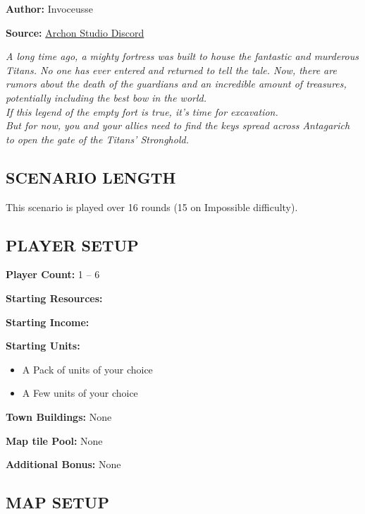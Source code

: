 
\begin{multicols*}{2}

\textbf{Author:} Invoceusse

\textbf{Source:} \href{https://discord.com/channels/740870068178649108/1219333721019256943}{Archon Studio Discord}

\textit{A long time ago, a mighty fortress was built to house the fantastic and murderous Titans.
  No one has ever entered and returned to tell the tale.
  Now, there are rumors about the death of the guardians and an incredible amount of treasures, potentially including the best bow in the world.\\
  If this legend of the empty fort is true, it's time for excavation.\\
  But for now, you and your allies need to find the keys spread across Antagarich to open the gate of the Titans' Stronghold.
}
\subsection*{\MakeUppercase{Scenario Length}}

This scenario is played over 16 rounds (15 on Impossible difficulty).

\subsection*{\MakeUppercase{Player setup}}

\textbf{Player Count:} 1 -- 6

\textbf{Starting Resources:}\par
{}

\textbf{Starting Income:}\par
{}

\textbf{Starting Units:}
\begin{itemize}
  \item A Pack of  units of your choice
  \item A Few  units of your choice
\end{itemize}

\textbf{Town Buildings:} None

\textbf{Map tile Pool:} None

\textbf{Additional Bonus:} None

\subsection*{\MakeUppercase{Map Setup}}


\end{multicols*}
